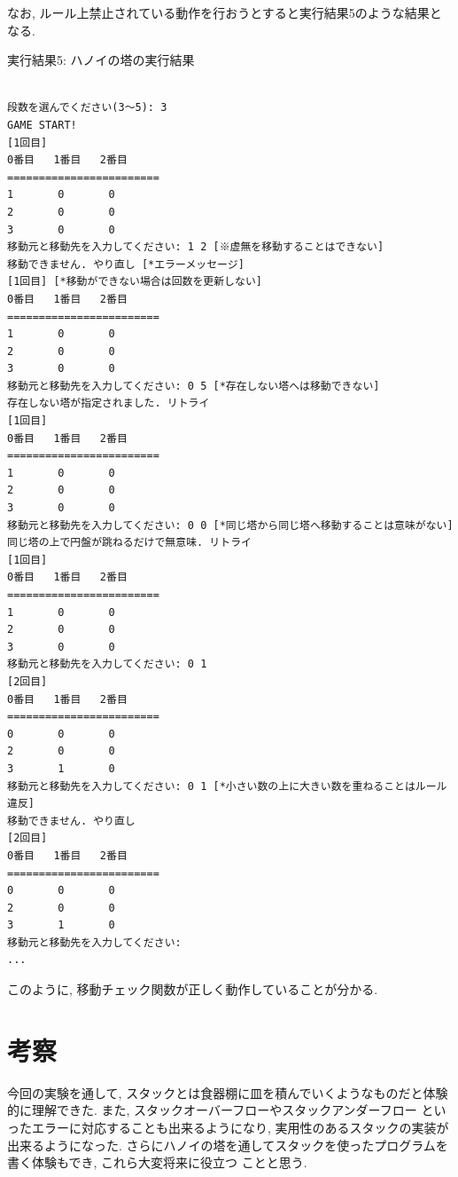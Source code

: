 \documentclass[a4j]{jsarticle}
\begin{document}
        なお, ルール上禁止されている動作を行おうとすると実行結果5のような結果となる. 
        \begin{breakitembox}[l]{実行結果5: ハノイの塔の実行結果}
        \begin{verbatim}

段数を選んでください(3〜5): 3
GAME START!
[1回目]
0番目   1番目   2番目
========================
1       0       0
2       0       0
3       0       0
移動元と移動先を入力してください: 1 2 [※虚無を移動することはできない]
移動できません. やり直し [*エラーメッセージ]
[1回目] [*移動ができない場合は回数を更新しない]
0番目   1番目   2番目
========================
1       0       0
2       0       0
3       0       0
移動元と移動先を入力してください: 0 5 [*存在しない塔へは移動できない]
存在しない塔が指定されました. リトライ
[1回目]
0番目   1番目   2番目
========================
1       0       0
2       0       0
3       0       0
移動元と移動先を入力してください: 0 0 [*同じ塔から同じ塔へ移動することは意味がない]
同じ塔の上で円盤が跳ねるだけで無意味. リトライ
[1回目]
0番目   1番目   2番目
========================
1       0       0
2       0       0
3       0       0
移動元と移動先を入力してください: 0 1
[2回目]
0番目   1番目   2番目
========================
0       0       0
2       0       0
3       1       0
移動元と移動先を入力してください: 0 1 [*小さい数の上に大きい数を重ねることはルール違反]
移動できません. やり直し
[2回目]
0番目   1番目   2番目
========================
0       0       0
2       0       0
3       1       0
移動元と移動先を入力してください:
...
        \end{verbatim}
        \end{breakitembox}
        このように, 移動チェック関数が正しく動作していることが分かる. 
\section{考察}
    今回の実験を通して, スタックとは食器棚に皿を積んでいくようなものだと体験的に理解できた. また, スタックオーバーフローやスタックアンダーフロー
    といったエラーに対応することも出来るようになり, 実用性のあるスタックの実装が出来るようになった. さらにハノイの塔を通してスタックを使ったプログラムを書く体験もでき, これら大変将来に役立つ
    ことと思う. 
\end{document}
